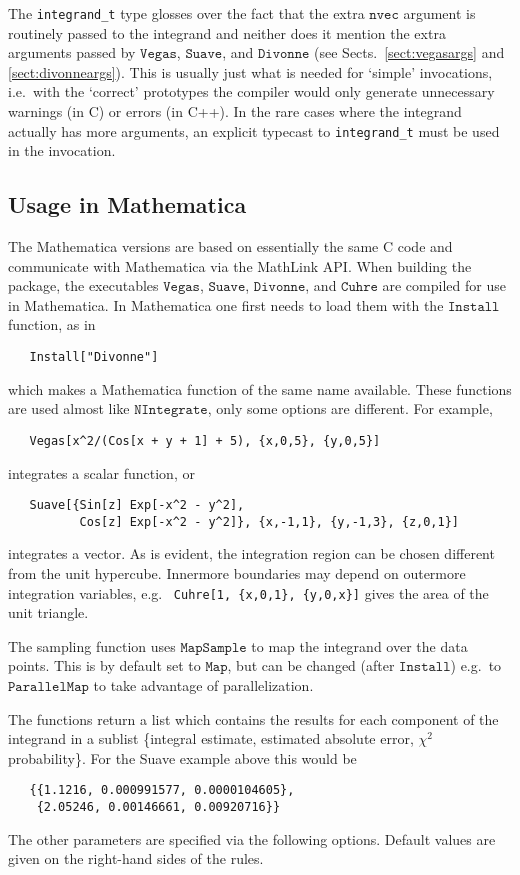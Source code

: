 \documentclass[12pt]{article}
\newcommand\ie{i.e.\ }
\newcommand\eg{e.g.\ }
\newcommand\Code[1]{\ensuremath{\texttt{#1}}}
\begin{document}
The \verb=integrand_t= type glosses over the fact that the extra 
\Code{nvec} argument is routinely passed to the integrand and 
neither does it mention the extra arguments passed by \Code{Vegas}, 
\Code{Suave}, and \Code{Divonne} (see Sects.\ \ref{sect:vegasargs} and 
\ref{sect:divonneargs}).  This is usually just what is needed for 
`simple' invocations, \ie with the `correct' prototypes the compiler 
would only generate unnecessary warnings (in C) or errors (in C++).  In 
the rare cases where the integrand actually has more arguments, an 
explicit typecast to \verb=integrand_t= must be used in the invocation.


\subsection{Usage in Mathematica}

The Mathematica versions are based on essentially the same C code and
communicate with Mathematica via the MathLink API.  When building the
package, the executables \Code{Vegas}, \Code{Suave},
\Code{Divonne}, and \Code{Cuhre} are compiled for use in
Mathematica.  In Mathematica one first needs to load them with the 
\Code{Install} function, as in
\begin{verbatim}
   Install["Divonne"]
\end{verbatim}
which makes a Mathematica function of the same name available.  These 
functions are used almost like \Code{NIntegrate}, only some options 
are different.  For example,
\begin{verbatim}
   Vegas[x^2/(Cos[x + y + 1] + 5), {x,0,5}, {y,0,5}]
\end{verbatim}
integrates a scalar function, or
\begin{verbatim}
   Suave[{Sin[z] Exp[-x^2 - y^2],
          Cos[z] Exp[-x^2 - y^2]}, {x,-1,1}, {y,-1,3}, {z,0,1}]
\end{verbatim}
integrates a vector.  As is evident, the integration region can be 
chosen different from the unit hypercube.  Innermore boundaries may 
depend on outermore integration variables, \eg
\verb=Cuhre[1, {x,0,1}, {y,0,x}]= gives the area of the unit triangle.

The sampling function uses \Code{MapSample} to map the integrand
over the data points.  This is by default set to \Code{Map}, but
can be changed (after \Code{Install}) \eg to \Code{ParallelMap}
to take advantage of parallelization.

The functions return a list which contains the results for each
component of the integrand in a sublist \{integral estimate, estimated 
absolute error, $\chi^2$ probability\}.  For the Suave example above 
this would be
\begin{verbatim}
   {{1.1216, 0.000991577, 0.0000104605}, 
    {2.05246, 0.00146661, 0.00920716}}
\end{verbatim}
The other parameters are specified via the following options.  Default 
values are given on the right-hand sides of the rules.
\end{document}
